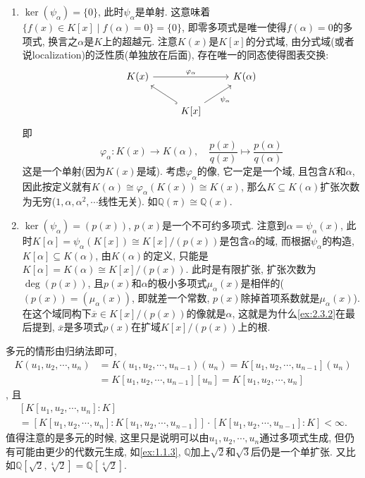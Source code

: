 \begin{remark}
    \begin{enumerate}
        \item $\ker(\psi_\alpha) = \{0\}$, 此时$\psi_\alpha$是单射. 这意味着$\{f(x) \in K[x] \mid f(\alpha) = 0\} = \{0\}$, 即零多项式是唯一使得$f(\alpha) = 0$的多项式, 换言之$\alpha$是$K$上的超越元. 注意$K(x)$是$K[x]$的分式域, 由分式域(或者说localization)的泛性质(单独放在后面), 存在唯一的同态使得图表交换:
        \[
            \begin{tikzcd}
                K(x) \arrow[rr, "\varphi_\alpha"] &                                                    & K(\alpha) \\
                                                  & {K[x]} \arrow[ru, "\psi_\alpha"'] \arrow[lu, hook] &          
            \end{tikzcd}
        \]
        即
        \[
            \varphi_\alpha:K(x) \to K(\alpha),\quad \frac{p(x)}{q(x)} \mapsto \frac{p(\alpha)}{q(\alpha)}
        \]
        这是一个单射(因为$K(x)$是域). 考虑$\varphi_\alpha$的像, 它一定是一个域, 且包含$K$和$\alpha$, 因此按定义就有$K(\alpha) \cong \varphi_\alpha(K(x)) \cong K(x)$, 那么$K \subseteq K(\alpha)$扩张次数为无穷($1, \alpha, \alpha^2, \cdots$线性无关). 如$\mathbb{Q}(\pi) \cong \mathbb{Q}(x)$.
        \item $\ker(\psi_\alpha) = (p(x))$, $p(x)$是一个不可约多项式. 注意到$\alpha = \psi_\alpha(x)$, 此时$K[\alpha] = \psi_\alpha(K[x]) \cong K[x]/(p(x))$是包含$\alpha$的域, 而根据$\psi_\alpha$的构造, $K[\alpha] \subseteq K(\alpha)$, 由$K(\alpha)$的定义, 只能是$K[\alpha] = K(\alpha) \cong K[x]/(p(x))$. 此时是有限扩张, 扩张次数为$\deg(p(x))$, 且$p(x)$和$\alpha$的极小多项式$\mu_\alpha(x)$是相伴的($(p(x)) = (\mu_\alpha(x))$, 即就差一个常数, $p(x)$除掉首项系数就是$\mu_\alpha(x)$). 在这个域同构下$\overline{x} \in K[x]/(p(x))$的像就是$\alpha$, 这就是为什么\ref{ex:2.3.2}在最后提到, $\overline{x}$是多项式$p(x)$在扩域$K[x]/(p(x))$上的根. 
    \end{enumerate}
    多元的情形由归纳法即可,
    \[
    \begin{aligned}
        K(u_1, u_2, \cdots, u_n) &= K(u_1, u_2, \cdots, u_{n - 1})(u_n) = K[u_1, u_2, \cdots, u_{n - 1}](u_n)\\
        &= K[u_1, u_2, \cdots, u_{n - 1}][u_n] = K[u_1, u_2, \cdots, u_n]
    \end{aligned} 
    \],
    且
    \[
    \begin{multlined}
        \left[K[u_1, u_2, \cdots, u_n]:K\right]\\
        = \left[K[u_1, u_2, \cdots, u_n]: K[u_1, u_2, \cdots, u_{n - 1}]\right] \cdot \left[K[u_1, u_2, \cdots, u_{n - 1}]:K\right] < \infty.
    \end{multlined}
    \]
    值得注意的是多元的时候, 这里只是说明可以由$u_1, u_2, \cdots, u_n$通过多项式生成, 但仍有可能由更少的代数元生成, 如\ref{ex:1.1.3}, $\mathbb{Q}$加上$\sqrt{2}$和$\sqrt{3}$后仍是一个单扩张. 又比如$\mathbb{Q}[\sqrt{2}, \sqrt[4]{2}] = \mathbb{Q}[\sqrt[4]{2}]$.


\end{remark}
